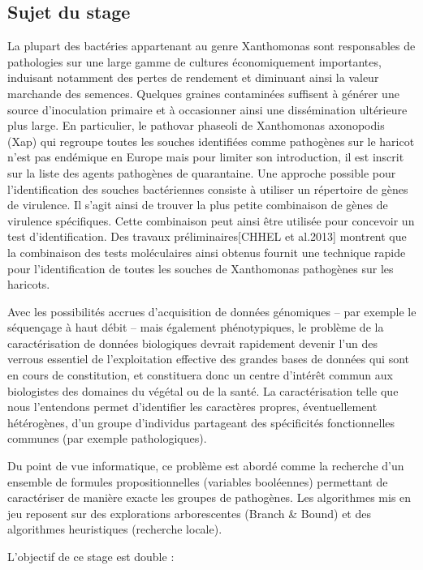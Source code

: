 \subsection*{Sujet du stage}
\par La plupart des bactéries appartenant au genre Xanthomonas sont responsables de pathologies sur
une large gamme de cultures économiquement importantes, induisant notamment des pertes
de rendement et diminuant ainsi la valeur marchande des semences. Quelques graines
contaminées suffisent à générer une source d'inoculation primaire et à occasionner ainsi une
dissémination ultérieure plus large. En particulier, le pathovar phaseoli de Xanthomonas axonopodis
(Xap) qui regroupe toutes les souches identifiées comme pathogènes sur le haricot n'est pas
endémique en Europe mais pour limiter son introduction, il est inscrit sur la liste des agents
pathogènes de quarantaine. Une approche possible pour l'identification des souches bactériennes
consiste à utiliser un répertoire de gènes de virulence. Il s'agit ainsi de trouver la plus petite
combinaison de gènes de virulence spécifiques. Cette combinaison peut ainsi être utilisée pour
concevoir un test d'identification. Des travaux préliminaires[CHHEL et al.2013] montrent que la combinaison des
tests moléculaires ainsi obtenus fournit une technique rapide pour l'identification de toutes les
souches de Xanthomonas pathogènes sur les haricots.
\par Avec les possibilités accrues d'acquisition de données génomiques – par exemple le séquençage à
haut débit – mais également phénotypiques, le problème de la caractérisation de données
biologiques devrait rapidement devenir l'un des verrous essentiel de l'exploitation effective des
grandes bases de données qui sont en cours de constitution, et constituera donc un centre d'intérêt
commun aux biologistes des domaines du végétal ou de la santé. La caractérisation telle que nous
l'entendons permet d'identifier les caractères propres, éventuellement hétérogènes, d'un groupe
d’individus partageant des spécificités fonctionnelles communes (par exemple pathologiques).
\par Du point de vue informatique, ce problème est abordé comme la recherche d'un ensemble de
formules propositionnelles (variables booléennes) permettant de caractériser de manière exacte les
groupes de pathogènes. Les algorithmes mis en jeu reposent sur des explorations arborescentes
(Branch \& Bound) et des algorithmes heuristiques (recherche locale).
\par L'objectif de ce stage est double :
